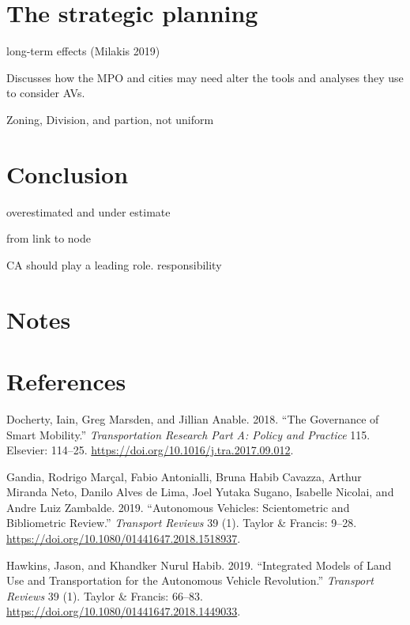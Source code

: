 \documentclass[12pt,]{article}
\begin{document}
\hypertarget{the-strategic-planning}{%
\section{The strategic planning}\label{the-strategic-planning}}

long-term effects (Milakis 2019)

Discusses how the MPO and cities may need alter the tools and analyses
they use to consider AVs.

Zoning, Division, and partion, not uniform

\hypertarget{conclusion}{%
\section{Conclusion}\label{conclusion}}

overestimated and under estimate

from link to node

CA should play a leading role. responsibility

\hypertarget{notes}{%
\section{Notes}\label{notes}}

\hypertarget{references}{%
\section*{References}\label{references}}

\hypertarget{refs}{}
\leavevmode\hypertarget{ref-docherty2018governance}{}%
Docherty, Iain, Greg Marsden, and Jillian Anable. 2018. ``The Governance
of Smart Mobility.'' \emph{Transportation Research Part A: Policy and
Practice} 115. Elsevier: 114--25.
\url{https://doi.org/10.1016/j.tra.2017.09.012}.

\leavevmode\hypertarget{ref-gandia2019autonomous}{}%
Gandia, Rodrigo Marçal, Fabio Antonialli, Bruna Habib Cavazza, Arthur
Miranda Neto, Danilo Alves de Lima, Joel Yutaka Sugano, Isabelle
Nicolai, and Andre Luiz Zambalde. 2019. ``Autonomous Vehicles:
Scientometric and Bibliometric Review.'' \emph{Transport Reviews} 39
(1). Taylor \& Francis: 9--28.
\url{https://doi.org/10.1080/01441647.2018.1518937}.

\leavevmode\hypertarget{ref-hawkins2019integrated}{}%
Hawkins, Jason, and Khandker Nurul Habib. 2019. ``Integrated Models of
Land Use and Transportation for the Autonomous Vehicle Revolution.''
\emph{Transport Reviews} 39 (1). Taylor \& Francis: 66--83.
\url{https://doi.org/10.1080/01441647.2018.1449033}.
\end{document}
